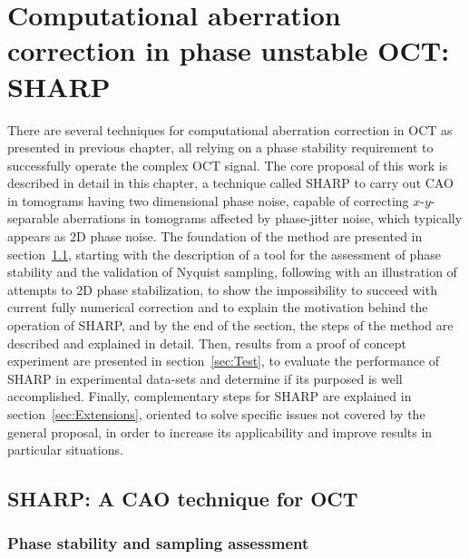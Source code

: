 \newpage
{}
\chapter[Computational aberration correction in phase unstable OCT: SHARP]{Computational aberration correction in phase unstable OCT: SHARP}\label{chap:SHARP}

There are several techniques for computational aberration correction in OCT as presented in previous chapter, all relying on a phase stability requirement to successfully operate the complex OCT signal. The core proposal of this work is described in detail in this chapter, a technique called SHARP to carry out CAO in tomograms having two dimensional phase noise, capable of correcting $x$-$y$-separable aberrations in tomograms affected by phase-jitter noise, which typically appears as 2D phase noise. The foundation of the method are presented in section~\ref{sec:SHARP}, starting with the description of a tool for the assessment of phase stability and the validation of Nyquist sampling, following with an illustration of attempts to 2D phase stabilization, to show the impossibility to succeed with current fully numerical correction and to explain the motivation behind the operation of SHARP, and by the end of the section, the steps of the method are described and explained in detail. Then, results from a proof of concept experiment are presented in section~\ref{sec:Test}, to evaluate the performance of SHARP in experimental data-sets and determine if its purposed is well accomplished. Finally, complementary steps for SHARP are explained in section~\ref{sec:Extensions}, oriented to solve specific issues not covered by the general proposal, in order to increase its applicability and improve results in particular situations.

\section{SHARP: A CAO technique for OCT}\label{sec:SHARP}

\subsection{Phase stability and sampling assessment}

